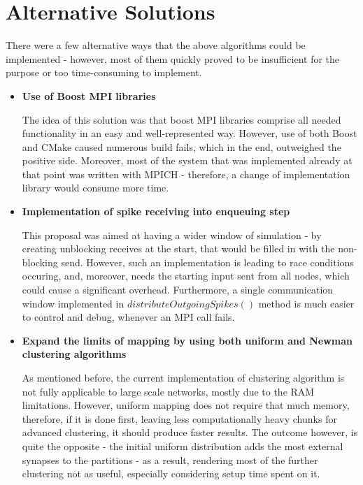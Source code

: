 \section{Alternative Solutions}

There were a few alternative ways that the above algorithms could be implemented - however, most of them quickly proved to be insufficient for the purpose or too time-consuming to implement.

\begin{itemize}
\item{\textbf{Use of Boost MPI libraries}}

The idea of this solution was that boost MPI libraries comprise all needed functionality in an easy and well-represented way. However, use of both Boost and CMake caused numerous build fails, which in the end, outweighed the positive side. Moreover, most of the system that was implemented already at that point was written with MPICH - therefore, a change of implementation library would consume more time.

\item{\textbf{Implementation of spike receiving into enqueuing step}}

This proposal was aimed at having a wider window of simulation - by creating unblocking receives at the start, that would be filled in with the non-blocking send. However, such an implementation is leading to race conditions occuring, and, moreover, needs the starting input sent from all nodes, which could cause a significant overhead. Furthermore, a single communication window implemented in $distributeOutgoingSpikes()$ method is much easier to control and debug, whenever an MPI call fails.

\item{\textbf{Expand the limits of mapping by using both uniform and Newman clustering algorithms}}

As mentioned before, the current implementation of clustering algorithm is not fully applicable to large scale networks, mostly due to the RAM limitations. However, uniform mapping does not require that much memory, therefore, if it is done first, leaving less computationally heavy chunks for advanced clustering, it should produce faster results. The outcome however, is quite the opposite - the initial uniform distribution adds the most external synapses to the partitions - as a result, rendering most of the further clustering not as useful, especially considering setup time spent on it.
\end{itemize}
